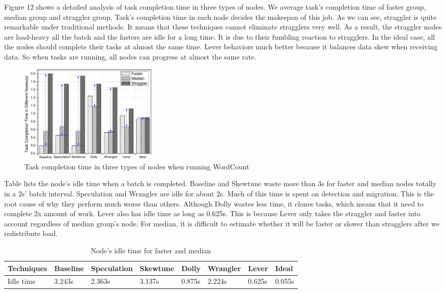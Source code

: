   Figure 12 shows a detailed analysis of task completion time in three types of nodes. We average task's completion time of faster group, median group and straggler group. Task's completion time in each node decides the makespan of this job. As we can see, straggler is quite remarkable under traditional methods. It means that these techniques cannot eliminate stragglers very well. As a result, the straggler nodes are load-heavy all the batch and the fasters are idle for a long time. It is due to their fumbling reaction to stragglers. In the ideal case, all the nodes should complete their tasks at almost the same time. Lever behaviors much better because it balances data skew when receiving data. So when tasks are running, all nodes can progress at almost the same rate.
  \begin{figure}[htbp]
    \centering
    \includegraphics[width=0.32\textwidth]{FigureMakeSpan}
    \caption{Task completion time in three types of nodes when running WordCount}
    \label{Fig. 12:}
  \end{figure}

  Table \uppercase\expandafter{} lists the node's idle time when a batch is completed. Baseline and Skewtune waste more than 3s for faster and median nodes totally in a 2s' batch interval. Speculation and Wrangler are idle for about 2s. Much of this time is spent on detection and migration. This is the root cause of why they perform much worse than others. Although Dolly wastes less time, it clones tasks, which means that it need to complete 2x amount of work. Lever also has idle time as long as 0.625s. This is because Lever only takes the straggler and faster into account regardless of median group's node. For median, it is difficult to estimate whether it will be faster or slower than stragglers after we redistribute load.
  \begin{table}[htbp]
    \small
    \centering
    \caption{Node's idle time for faster and median}
    \begin{threeparttable}
    \centering
      \begin{tabular}{|p{1.4cm}|p{1.2cm}|p{1.5cm}|p{1.2cm}|p{0.9cm}|p{1.2cm}|p{0.9cm}|p{0.9cm}|}
        \hline
        Techniques & Baseline & Speculation & Skewtune & Dolly & Wrangler & Lever & Ideal \\
        \hline
        Idle time & 3.243s & 2.363s & 3.137s & 0.875s & 2.224s & 0.625s & 0.055s \\
        \hline
      \end{tabular}
    \end{threeparttable}
    \label{Table3}
  \end{table}

